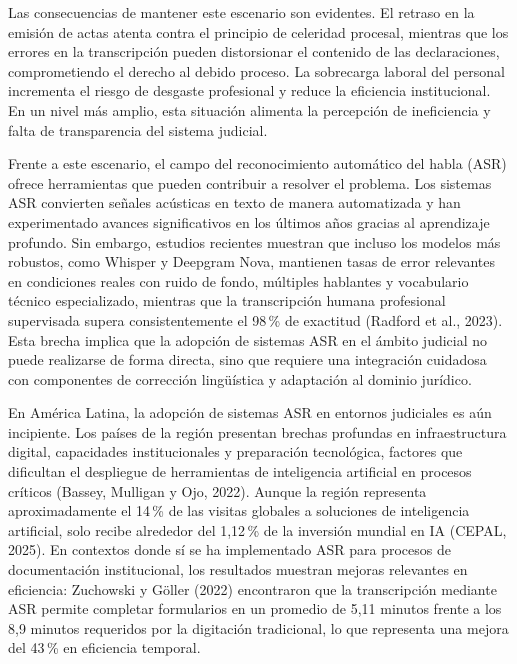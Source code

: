 \documentclass[12pt,a4paper,oneside]{report}
\begin{document}
Las consecuencias de mantener este escenario son evidentes. El retraso en la emisión de actas atenta contra el principio de celeridad procesal, mientras que los errores en la transcripción pueden distorsionar el contenido de las declaraciones, comprometiendo el derecho al debido proceso. La sobrecarga laboral del personal incrementa el riesgo de desgaste profesional y reduce la eficiencia institucional. En un nivel más amplio, esta situación alimenta la percepción de ineficiencia y falta de transparencia del sistema judicial.

Frente a este escenario, el campo del reconocimiento automático del habla (ASR) ofrece herramientas que pueden contribuir a resolver el problema. Los sistemas ASR convierten señales acústicas en texto de manera automatizada y han experimentado avances significativos en los últimos años gracias al aprendizaje profundo. Sin embargo, estudios recientes muestran que incluso los modelos más robustos, como Whisper y Deepgram Nova, mantienen tasas de error relevantes en condiciones reales con ruido de fondo, múltiples hablantes y vocabulario técnico especializado, mientras que la transcripción humana profesional supervisada supera consistentemente el 98\,\% de exactitud (Radford et al., 2023). Esta brecha implica que la adopción de sistemas ASR en el ámbito judicial no puede realizarse de forma directa, sino que requiere una integración cuidadosa con componentes de corrección lingüística y adaptación al dominio jurídico.

En América Latina, la adopción de sistemas ASR en entornos judiciales es aún incipiente. Los países de la región presentan brechas profundas en infraestructura digital, capacidades institucionales y preparación tecnológica, factores que dificultan el despliegue de herramientas de inteligencia artificial en procesos críticos (Bassey, Mulligan y Ojo, 2022). Aunque la región representa aproximadamente el 14\,\% de las visitas globales a soluciones de inteligencia artificial, solo recibe alrededor del 1,12\,\% de la inversión mundial en IA (CEPAL, 2025). En contextos donde sí se ha implementado ASR para procesos de documentación institucional, los resultados muestran mejoras relevantes en eficiencia: Zuchowski y Göller (2022) encontraron que la transcripción mediante ASR permite completar formularios en un promedio de 5,11 minutos frente a los 8,9 minutos requeridos por la digitación tradicional, lo que representa una mejora del 43\,\% en eficiencia temporal.
\end{document}
